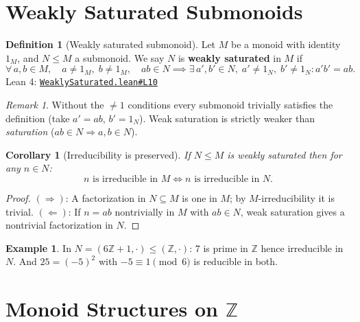 \documentclass[11pt,a4paper]{amsart}
\theoremstyle{plain}
\newtheorem{corollary}[theorem]{Corollary}
\theoremstyle{definition}
\newtheorem{definition}[theorem]{Definition}
\newtheorem{example}[theorem]{Example}
\theoremstyle{remark}
\newtheorem{remark}[theorem]{Remark}
\newcommand{\Z}{\mathbb{Z}}
\newcommand{\GH}{https://github.com/FruitfulApproach/Lean4TPC/blob/main}
\begin{document}
\tableofcontents

\section{Weakly Saturated Submonoids}

\begin{definition}[Weakly saturated submonoid]
\label{def:ws}
Let $M$ be a monoid with identity $1_M$, and $N \leqslant M$ a submonoid.
We say $N$ is \textbf{weakly saturated} in $M$ if
\[
\forall\, a, b \in M,\quad a \neq 1_M,\; b \neq 1_M,\quad
ab \in N \implies
\exists\, a', b' \in N,\; a' \neq 1_N,\; b' \neq 1_N : a'b' = ab.
\]
\textnormal{Lean 4:} \href{\GH/TPC/WeaklySaturated.lean\#L10}{\texttt{WeaklySaturated.lean\#L10}}
\end{definition}

\begin{remark}
Without the $\neq 1$ conditions every submonoid trivially satisfies the
definition (take $a' = ab$, $b' = 1_N$).  Weak saturation is strictly
weaker than \emph{saturation} ($ab \in N \Rightarrow a, b \in N$).
\end{remark}

\begin{corollary}[Irreducibility is preserved]
\label{cor:irred-preserved}
If $N \leqslant M$ is weakly saturated then for any $n \in N$:
\[
n \text{ is irreducible in } M \iff n \text{ is irreducible in } N.
\]
\end{corollary}

\begin{proof}
$(\Rightarrow)$: A factorization in $N \subseteq M$ is one in $M$; by
$M$-irreducibility it is trivial.
$(\Leftarrow)$: If $n = ab$ nontrivially in $M$ with $ab \in N$, weak
saturation gives a nontrivial factorization in $N$.
\end{proof}

\begin{example}
In $N = (6\Z+1, \cdot) \leqslant (\Z, \cdot)$: $7$ is prime in $\Z$ hence
irreducible in $N$.  And $25 = (-5)^2$ with $-5 \equiv 1 \pmod{6}$ is
reducible in both.
\end{example}

\section{Monoid Structures on $\Z$}
\end{document}
